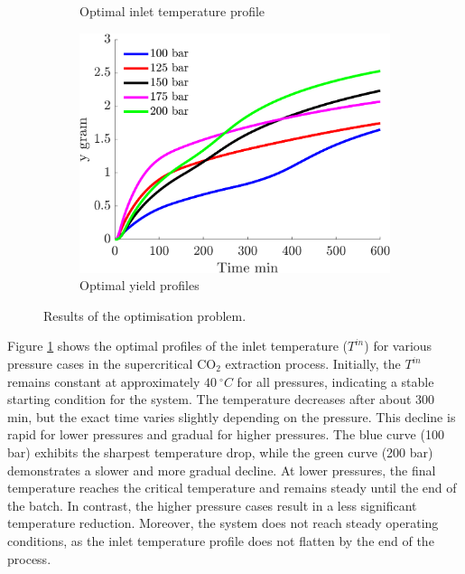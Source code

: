 \documentclass[a4paper,fleqn]{cas-dc}
\begin{document}
\begin{figure}[t!]
\begin{subfigure}[t]{\columnwidth}
				\caption{Optimal inlet temperature profile}
				\label{fig:profiles_T}
			\end{subfigure}
			\par\bigskip %
			\begin{subfigure}[t]{\columnwidth}
				\centering
				\includegraphics[width=0.90\columnwidth]{Figures/Results/yield.png}	
				\caption{Optimal yield profiles}
				\label{fig:profiles_y}
			\end{subfigure}
			\caption{Results of the optimisation problem.}
		\end{figure}	
		
		Figure \ref{fig:profiles_T} shows the optimal profiles of the inlet temperature ($T^{in}$) for various pressure cases in the supercritical CO$_2$ extraction process. Initially, the $T^{in}$ remains constant at approximately $40~^\circ C$ for all pressures, indicating a stable starting condition for the system. The temperature decreases after about 300 min, but the exact time varies slightly depending on the pressure. This decline is rapid for lower pressures and gradual for higher pressures. The blue curve (100 bar) exhibits the sharpest temperature drop, while the green curve (200 bar) demonstrates a slower and more gradual decline. At lower pressures, the final temperature reaches the critical temperature and remains steady until the end of the batch. In contrast, the higher pressure cases result in a less significant temperature reduction. Moreover, the system does not reach steady operating conditions, as the inlet temperature profile does not flatten by the end of the process.
		
\end{document}
